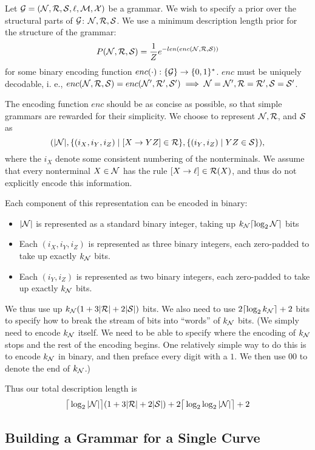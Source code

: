 \documentclass{article}
\begin{document}
Let ${\mathcal G}=({\mathcal N},{\mathcal R},{\mathcal S},\ell,{\mathcal M},{\mathcal X})$ be a grammar. We wish to
specify a prior over the structural parts of ${\mathcal G}$: ${\mathcal N}, {\mathcal R},
{\mathcal S}$. We use a minimum description length prior for the structure of
the grammar:
$$P({\mathcal N},{\mathcal R},{\mathcal S}) = \frac{1}{Z} e^{-len(enc({\mathcal N},{\mathcal R},{\mathcal S}))}$$
for some binary encoding function $enc(\cdot): \{{\mathcal G}\} \to
\{0,1\}^*$. $enc$ must be uniquely decodable, i. e.,
$enc({\mathcal N},{\mathcal R},{\mathcal S}) = enc({\mathcal N}',{\mathcal R}',{\mathcal S}') \implies {\mathcal N}={\mathcal N}',
{\mathcal R}={\mathcal R}', {\mathcal S}={\mathcal S}'$.

The encoding function $enc$ should be as concise as possible, so that
simple grammars are rewarded for their simplicity.  We choose to
represent ${\mathcal N}, {\mathcal R}$, and ${\mathcal S}$ as
$$(|{\mathcal N}|, \{(i_X,i_Y,i_Z) \mid [X\to YZ] \in {\mathcal R}\}, \{(i_Y,i_Z) \mid
YZ\in {\mathcal S} \} ),$$ where the $i_X$ denote some consistent numbering of
the nonterminals. We assume that every nonterminal $X\in {\mathcal N}$ has the
rule $[X\to \ell] \in {\mathcal R}(X)$, and thus do not explicitly encode this
information.

Each component of this representation can be encoded in binary:
\begin{itemize}
\item $|{\mathcal N}|$ is represented as a standard binary integer, taking up
  $k_{\mathcal N} \lceil \log_2 {\mathcal N} \rceil$ bits
\item Each $(i_X, i_Y, i_Z)$ is represented as three binary integers,
  each zero-padded to take up exactly $k_{\mathcal N}$ bits.
\item Each $(i_Y, i_Z)$ is represented as two binary integers, each
  zero-padded to take up exactly $k_{\mathcal N}$ bits.
\end{itemize}

We thus use up $k_{\mathcal N} (1 + 3 |{\mathcal R}| + 2 |{\mathcal S}|)$ bits. We also need
to use $2 \lceil \log_2 k_{\mathcal N} \rceil + 2$ bits to specify how to
break the stream of bits into ``words'' of $k_{\mathcal N}$ bits. (We simply
need to encode $k_{\mathcal N}$ itself. We need to be able to specify where
the encoding of $k_{\mathcal N}$ stops and the rest of the encoding
begins. One relatively simple way to do this is to encode $k_{\mathcal N}$ in
binary, and then preface every digit with a $1$. We then use $00$ to
denote the end of $k_{\mathcal N}$.)

Thus our total description length is
\begin{align*}
\big\lceil \log_2 |{\mathcal N}| \big\rceil (1 + 3 |{\mathcal R}| + 2|{\mathcal S}|) + 2 \big\lceil
\log_2 \log_2 |{\mathcal N}| \big\rceil + 2
\end{align*}

\subsection{Building a Grammar for a Single Curve}
\label{sec-single}
\end{document}
